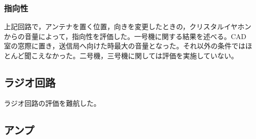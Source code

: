 \documentclass[report.tex]{subfiles}
\begin{document}
\subsubsection{指向性}
上記回路で，アンテナを置く位置，向きを変更したときの，クリスタルイヤホンからの音量によって，指向性を評価した。一号機に関する結果を述べる。CAD室の窓際に置き，送信局へ向けた時最大の音量となった。それ以外の条件ではほとんど聞こえなかった。二号機，三号機に関しては評価を実施していない。

\subsection{ラジオ回路}
ラジオ回路の評価を難航した。

\subsection{アンプ}
\end{document}
